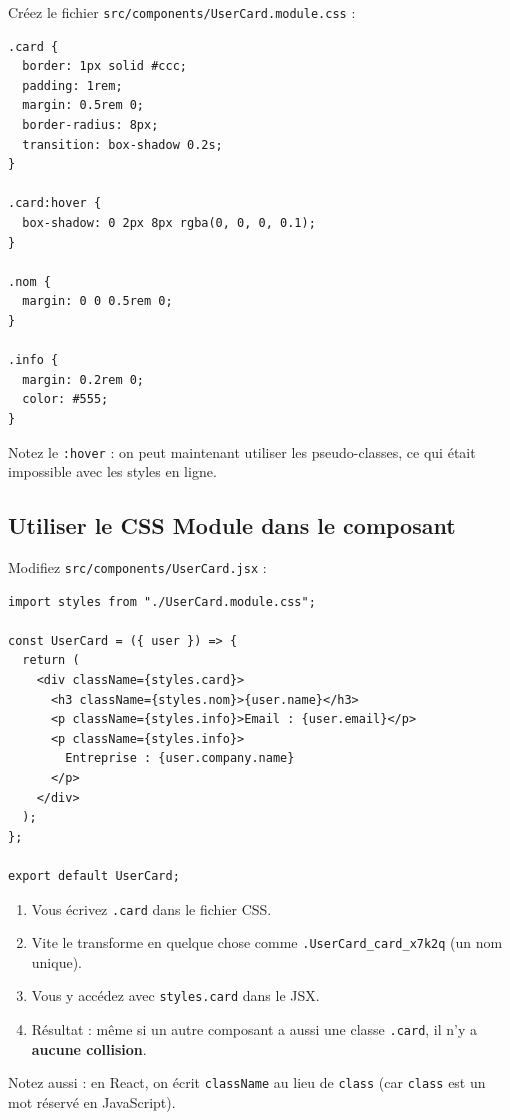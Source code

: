 \documentclass[11pt,a4paper]{article}
\begin{document}
Créez le fichier \texttt{src/components/UserCard.module.css} :

\begin{lstlisting}[style=css]
.card {
  border: 1px solid #ccc;
  padding: 1rem;
  margin: 0.5rem 0;
  border-radius: 8px;
  transition: box-shadow 0.2s;
}

.card:hover {
  box-shadow: 0 2px 8px rgba(0, 0, 0, 0.1);
}

.nom {
  margin: 0 0 0.5rem 0;
}

.info {
  margin: 0.2rem 0;
  color: #555;
}
\end{lstlisting}

Notez le \texttt{:hover} : on peut maintenant utiliser les pseudo-classes, ce qui était impossible avec les styles en ligne.

\subsection{Utiliser le CSS Module dans le composant}

Modifiez \texttt{src/components/UserCard.jsx} :

\begin{lstlisting}
import styles from "./UserCard.module.css";

const UserCard = ({ user }) => {
  return (
    <div className={styles.card}>
      <h3 className={styles.nom}>{user.name}</h3>
      <p className={styles.info}>Email : {user.email}</p>
      <p className={styles.info}>
        Entreprise : {user.company.name}
      </p>
    </div>
  );
};

export default UserCard;
\end{lstlisting}

\begin{infobox}
\begin{enumerate}[nosep]
    \item Vous écrivez \texttt{.card} dans le fichier CSS.
    \item Vite le transforme en quelque chose comme \texttt{.UserCard\_card\_x7k2q} (un nom unique).
    \item Vous y accédez avec \texttt{styles.card} dans le JSX.
    \item Résultat : même si un autre composant a aussi une classe \texttt{.card}, il n'y a \textbf{aucune collision}.
\end{enumerate}

Notez aussi : en React, on écrit \texttt{className} au lieu de \texttt{class} (car \texttt{class} est un mot réservé en JavaScript).
\end{infobox}
\end{document}

